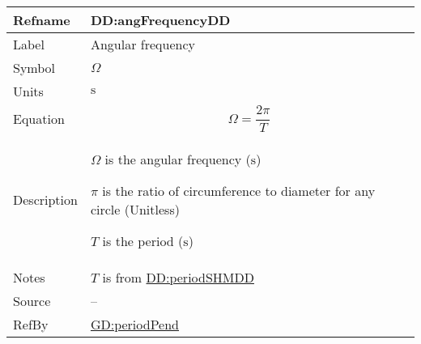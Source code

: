 \documentclass[12pt]{article}
\begin{document}
\vspace{\baselineskip}
\noindent
\begin{minipage}{\textwidth}
\begin{tabular}{>{\raggedright}p{}>{\raggedright\arraybackslash}p{}}
\toprule \textbf{Refname} & \textbf{DD:angFrequencyDD}
\label{DD:angFrequencyDD}
\\ \midrule
Label & Angular frequency
        
\\ \midrule
Symbol & $Ω$
         
\\ \midrule
Units & ${\text{s}}$
        
\\ \midrule
Equation & \begin{displaymath}
           Ω=\frac{2 π}{T}
           \end{displaymath}
\\ \midrule
Description & \begin{symbDescription}
              \item{$Ω$ is the angular frequency (${\text{s}}$)}
              \item{$π$ is the ratio of circumference to diameter for any circle (Unitless)}
              \item{$T$ is the period (${\text{s}}$)}
              \end{symbDescription}
\\ \midrule
Notes & $T$ is from \hyperref[DD:periodSHMDD]{DD:periodSHMDD}
        
\\ \midrule
Source & --
         
\\ \midrule
RefBy & \hyperref[GD:periodPend]{GD:periodPend}
        
\\ \bottomrule
\end{tabular}
\end{minipage}
\end{document}
